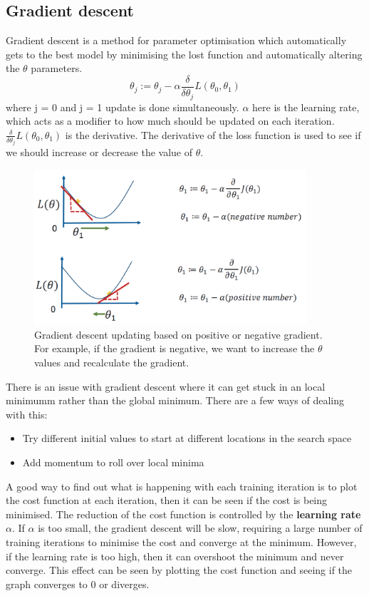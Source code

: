 \documentclass[CS5104-Notes.tex]{subfiles}
\begin{document}
\subsection{Gradient descent}
Gradient descent is a method for parameter optimisation which automatically gets to the best model by minimising the lost function and automatically altering the $\theta$ parameters.
\begin{equation}
  \theta_{j} := \theta_{j} - \alpha \frac{\delta}{\delta \theta_{j}} L(\theta_{0}, \theta_{1})
\end{equation}
where j = 0 and j = 1 update is done simultaneously. $\alpha$ here is the learning rate, which acts as a modifier to how much should be updated on each iteration. $\frac{\delta}{\delta \theta_{j}} L(\theta_{0}, \theta_{1})$ is the derivative. The derivative of the loss function is used to see if we should increase or decrease the value of $\theta$.
\begin{figure}[H]
  \centering
  \includegraphics[width=0.9\textwidth, keepaspectratio]{imgs/gradient-descent.png}
  \caption{Gradient descent updating based on positive or negative gradient. For example, if the gradient is negative, we want to increase the $\theta$ values and recalculate the gradient.}
\end{figure}
There is an issue with gradient descent where it can get stuck in an local minimumm rather than the global minimum. There are a few ways of dealing with this:
\begin{itemize}
\item Try different initial values to start at different locations in the search space
\item Add momentum to roll over local minima
\end{itemize}
A good way to find out what is happening with each training iteration is to plot the cost function at each iteration, then it can be seen if the cost is being minimised. The reduction of the cost function is controlled by the \textbf{learning rate} $\alpha$. If $\alpha$ is too small, the gradient descent will be slow, requiring a large number of training iterations to minimise the cost and converge at the minimum. However, if the learning rate is too high, then it can overshoot the minimum and never converge. This effect can be seen by plotting the cost function and seeing if the graph converges to 0 or diverges. 
\end{document}
